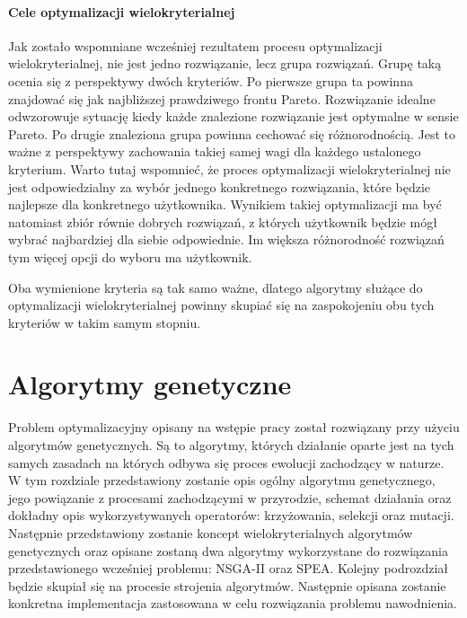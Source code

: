 \documentclass[twoside]{iisthesis}
\begin{document}
\subsubsection{Cele optymalizacji wielokryterialnej}
Jak zostało wspomniane wcześniej rezultatem procesu optymalizacji wielokryterialnej, nie jest jedno rozwiązanie, lecz grupa rozwiązań. Grupę taką ocenia się z perspektywy dwóch kryteriów. Po pierwsze grupa ta powinna znajdować się jak najbliższej prawdziwego frontu Pareto. Rozwiązanie idealne odwzorowuje sytuację kiedy każde znalezione rozwiązanie jest optymalne w sensie Pareto. Po drugie znaleziona grupa powinna cechować się różnorodnością. Jest to ważne z perspektywy zachowania takiej samej wagi dla każdego ustalonego kryterium. Warto tutaj wspomnieć, że proces optymalizacji wielokryterialnej nie jest odpowiedzialny za wybór jednego konkretnego rozwiązania, które będzie najlepsze dla konkretnego użytkownika. Wynikiem takiej optymalizacji ma być natomiast zbiór równie dobrych rozwiązań, z których użytkownik będzie mógł wybrać najbardziej dla siebie odpowiednie. Im większa różnorodność rozwiązań tym więcej opcji do wyboru ma użytkownik.

Oba wymienione kryteria są tak samo ważne, dlatego algorytmy służące do optymalizacji wielokryterialnej powinny skupiać się na zaspokojeniu obu tych kryteriów w takim samym stopniu.
\chapter{Algorytmy genetyczne}
Problem optymalizacyjny opisany na wstępie pracy został rozwiązany przy użyciu algorytmów genetycznych. Są to algorytmy, których działanie oparte jest na tych samych zasadach na których odbywa się proces ewolucji zachodzący w naturze. W tym rozdziale przedstawiony zostanie opis ogólny algorytmu genetycznego, jego powiązanie z procesami zachodzącymi w przyrodzie, schemat działania oraz dokładny opis wykorzystywanych operatorów: krzyżowania, selekcji oraz mutacji. Następnie przedstawiony zostanie koncept wielokryterialnych algorytmów genetycznych oraz opisane zostaną dwa algorytmy wykorzystane do rozwiązania przedstawionego wcześniej problemu: NSGA-II oraz SPEA. Kolejny podrozdział będzie skupiał się na procesie strojenia algorytmów. Następnie opisana zostanie konkretna implementacja zastosowana w celu rozwiązania problemu nawodnienia.
\end{document}
